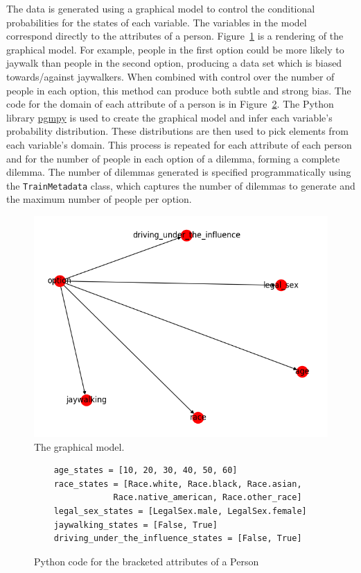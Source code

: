 \documentclass[]{report}
\newcommand{\code}{\texttt}
\begin{document}
The data is generated using a graphical model to control the conditional probabilities for the
states of each variable. The variables in the model correspond directly to the attributes of a
person. Figure~\ref{fig:graphical_model_image} is a rendering of the graphical model. For example,
people in the first option could be more likely to jaywalk than people in the second option,
producing a data set which is biased towards/against jaywalkers. When combined with control over the
number of people in each option, this method can produce both subtle and strong bias. The code for
the domain of each attribute of a person is in Figure~\ref{fig:code_for_person_attribute_domains}.
The Python library \href{https://github.com/pgmpy/pgmpy}{pgmpy} is used to create the graphical
model and infer each variable’s probability distribution. These distributions are then used to pick
elements from each variable’s domain. This process is repeated for each attribute of each person and
for the number of people in each option of a dilemma, forming a complete dilemma. The number of
dilemmas generated is specified programmatically using the \code{TrainMetadata} class, which
captures the number of dilemmas to generate and the maximum number of people per option.

\begin{figure}[h]
    \centering
    \includegraphics[scale=0.6]{figures/network.png}
    \caption[]{The graphical model.}
    \label{fig:graphical_model_image}
\end{figure}

\begin{figure}[h]
    \centering
    \begin{verbatim}
    age_states = [10, 20, 30, 40, 50, 60]
    race_states = [Race.white, Race.black, Race.asian,
                Race.native_american, Race.other_race]
    legal_sex_states = [LegalSex.male, LegalSex.female]
    jaywalking_states = [False, True]
    driving_under_the_influence_states = [False, True]
    \end{verbatim}
    \caption{Python code for the bracketed attributes of a Person}
    \label{fig:code_for_person_attribute_domains}
\end{figure}
\end{document}
